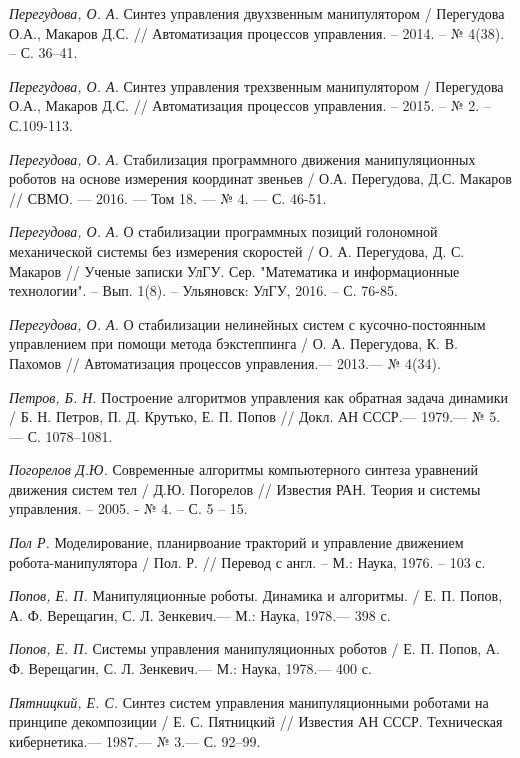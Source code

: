 \begin{thebibliography}{10}
	{\it Перегудова, О. А.} Синтез управления двухзвенным манипулятором / Перегудова О.А., Макаров Д.С. // Автоматизация процессов управления. – 		2014. – № 4(38). – С. 36–41.
	
	{\it Перегудова, О. А.} Синтез управления трехзвенным манипулятором / Перегудова О.А., Макаров Д.С. // Автоматизация процессов управления. – 		2015. – № 2. – С.109-113.

	{\it Перегудова, О. А.} Стабилизация программного движения манипуляционных роботов на основе измерения координат звеньев / О.А. Перегудова, Д.С. 	Макаров // СВМО. — 2016. — Том 18. — № 4. — С. 46-51.
	
	{\it Перегудова, О. А.} О стабилизации программных позиций голономной механической системы без измерения скоростей /  О. А. Перегудова, Д. С. Макаров // Ученые записки УлГУ. Сер. "Математика и информационные технологии". -- Вып. 1(8). -- Ульяновск: УлГУ, 2016. -- С. 76-85.

	{\it Перегудова, О. А.} О стабилизации нелинейных систем с кусочно-постоянным управлением при помощи метода бэкстеппинга / О. А. Перегудова, К. 	В. Пахомов // Автоматизация процессов управления.—  2013.— № 4(34).

	{\it Петров, Б. Н.} Построение алгоритмов управления как обратная задача динамики / Б. Н. Петров, П. Д. Крутько, Е. П. Попов // Докл. АН СССР.— 	1979.— № 5.— С. 1078–1081.
	
	{\it Погорелов Д.Ю.} Современные алгоритмы компьютерного синтеза уравнений движения систем тел / Д.Ю. Погорелов // Известия РАН. Теория и 		системы управления. – 2005. - № 4. – С. 5 – 15.
	
	{\it Пол Р.} Моделирование, планирвоание тракторий и управление движением робота-манипулятора / Пол. Р. // Перевод с англ. – М.: Наука, 1976. – 103 с.
	
	{\it Попов, Е. П.} Манипуляционные роботы. Динамика и алгоритмы. / Е. П. Попов, А. Ф. Верещагин,
	С. Л. Зенкевич.— М.: Наука, 1978.— 398 с.

	{\it Попов, Е. П.} Системы управления манипуляционных роботов / Е. П. Попов, А. Ф. Верещагин,
	С. Л. Зенкевич.— М.: Наука, 1978.— 400 с.
	
	{\it Пятницкий, Е. С.} Синтез систем управления манипуляционными роботами на принципе декомпозиции
	/ Е. С. Пятницкий // Известия АН СССР. Техническая кибернетика.—
	1987.— № 3.— С. 92–99.
	

\end{thebibliography}
